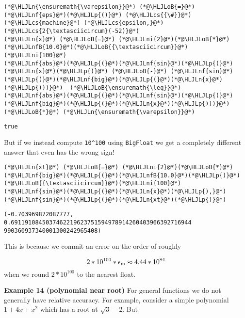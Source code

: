 \documentclass[12pt,a4paper]{article}
\newcommand{\HLJLn}[1]{#1}
\newcommand{\HLJLnf}[1]{\textcolor[RGB]{66,102,213}{#1}}
\newcommand{\HLJLnfB}[1]{\textcolor[RGB]{59,151,46}{#1}}
\newcommand{\HLJLni}[1]{\textcolor[RGB]{59,151,46}{#1}}
\newcommand{\HLJLoB}[1]{\textcolor[RGB]{102,102,102}{\textbf{#1}}}
\newcommand{\HLJLp}[1]{#1}
\newcommand{\HLJLcs}[1]{\textcolor[RGB]{153,153,119}{\textit{#1}}}
\begin{document}
\begin{lstlisting}
(*@\HLJLn{\ensuremath{\varepsilon}}@*) (*@\HLJLoB{=}@*) (*@\HLJLnf{eps}@*)(*@\HLJLp{()}@*) (*@\HLJLcs{{\#}}@*) (*@\HLJLcs{machine}@*) (*@\HLJLcs{epsilon,}@*) (*@\HLJLcs{2{\textasciicircum}(-52)}@*)
(*@\HLJLn{x}@*) (*@\HLJLoB{=}@*) (*@\HLJLni{2}@*)(*@\HLJLoB{*}@*)(*@\HLJLnfB{10.0}@*)(*@\HLJLoB{{\textasciicircum}}@*)(*@\HLJLni{100}@*)
(*@\HLJLnf{abs}@*)(*@\HLJLp{(}@*)(*@\HLJLnf{sin}@*)(*@\HLJLp{(}@*)(*@\HLJLn{x}@*)(*@\HLJLp{)}@*) (*@\HLJLoB{-}@*) (*@\HLJLnf{sin}@*)(*@\HLJLp{(}@*)(*@\HLJLnf{big}@*)(*@\HLJLp{(}@*)(*@\HLJLn{x}@*)(*@\HLJLp{)))}@*)  (*@\HLJLoB{\ensuremath{\leq}}@*)  (*@\HLJLnf{abs}@*)(*@\HLJLp{(}@*)(*@\HLJLnf{sin}@*)(*@\HLJLp{(}@*)(*@\HLJLnf{big}@*)(*@\HLJLp{(}@*)(*@\HLJLn{x}@*)(*@\HLJLp{)))}@*) (*@\HLJLoB{*}@*) (*@\HLJLn{\ensuremath{\varepsilon}}@*)
\end{lstlisting}

\begin{lstlisting}
true
\end{lstlisting}


But if we instead compute \texttt{10\^{}100} using \texttt{BigFloat} we get a completely different answer that even has the wrong sign!


\begin{lstlisting}
(*@\HLJLn{xt}@*) (*@\HLJLoB{=}@*) (*@\HLJLni{2}@*)(*@\HLJLoB{*}@*)(*@\HLJLnf{big}@*)(*@\HLJLp{(}@*)(*@\HLJLnfB{10.0}@*)(*@\HLJLp{)}@*)(*@\HLJLoB{{\textasciicircum}}@*)(*@\HLJLni{100}@*)
(*@\HLJLnf{sin}@*)(*@\HLJLp{(}@*)(*@\HLJLn{x}@*)(*@\HLJLp{),}@*) (*@\HLJLnf{sin}@*)(*@\HLJLp{(}@*)(*@\HLJLn{xt}@*)(*@\HLJLp{)}@*)
\end{lstlisting}

\begin{lstlisting}
(-0.703969872087777, 0.6911910845037462219623751594978914260403966392716944
990360937340001300242965408)
\end{lstlisting}


This is because we commit an error on the order of roughly

\[
2 * 10^{100} * \ensuremath{\epsilon}_{\rm m} \approx 4.44 * 10^{84}
\]
when we round $2*10^{100}$ to the nearest float.

\textbf{Example  14 (polynomial near root)} For general functions we do not generally have relative accuracy. For example, consider a simple polynomial $1 + 4x + x^2$ which has a root at $\sqrt 3 - 2$. But
\end{document}

